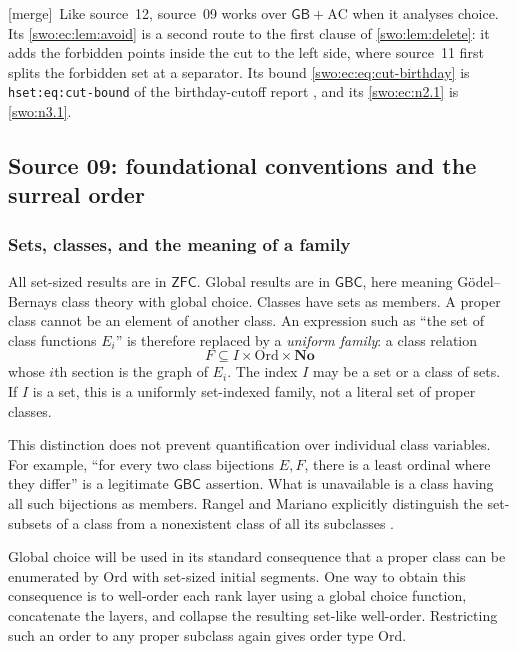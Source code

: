 \documentclass[11pt]{article}
\theoremstyle{definition}
\theoremstyle{remark}
\newcommand{\No}{\mathbf{No}}
\newcommand{\Ord}{\mathrm{Ord}}
\newcommand{\GB}{\mathsf{GB}}
\newcommand{\GBC}{\mathsf{GBC}}
\newcommand{\ZFC}{\mathsf{ZFC}}
\newcommand{\code}[1]{\texttt{\small #1}}
\newcommand{\merge}{\textsf{[merge]}}
\begin{document}

\merge\ Like source~12, source~09 works over $\GB+\mathrm{AC}$ when it
analyses choice. Its \cref{swo:ec:lem:avoid} is a second route to the first
clause of \cref{swo:lem:delete}: it adds the forbidden points inside the cut
to the left side, where source~11 first splits the forbidden set at a
separator. Its bound \eqref{swo:ec:eq:cut-birthday} is
\code{hset:eq:cut-bound} of the birthday-cutoff report \cite{ProveItHset},
and its \cref{swo:ec:n2.1} is \cref{swo:n3.1}.

\subsection{Source 09: foundational conventions and the surreal order}
\label{swo:ec:sec:foundations}
\subsubsection{Sets, classes, and the meaning of a family}
All set-sized results are in $\ZFC$. Global results are in $\GBC$, here
meaning G\"odel--Bernays class theory with global choice. Classes have sets
as members. A proper class cannot be an element of another class. An
expression such as ``the set of class functions $E_i$'' is therefore
replaced by a \emph{uniform family}: a class relation
\[
       F\subseteq I\times\Ord\times\No
\]
whose $i$th section is the graph of $E_i$. The index $I$ may be a set or a
class of sets. If $I$ is a set, this is a uniformly set-indexed family,
not a literal set of proper classes.

This distinction does not prevent quantification over individual class
variables. For example, ``for every two class bijections $E,F$, there is
a least ordinal where they differ'' is a legitimate $\GBC$ assertion.
What is unavailable is a class having all such bijections as members.
Rangel and Mariano explicitly distinguish the set-subsets of a class
from a nonexistent class of all its subclasses \cite[\S1.1.1]{RochaRangelMariano}.

Global choice will be used in its standard consequence that a proper
class can be enumerated by $\Ord$ with set-sized initial segments. One
way to obtain this consequence is to well-order each rank layer using a
global choice function, concatenate the layers, and collapse the resulting
set-like well-order. Restricting such an order to any proper subclass
again gives order type $\Ord$.
\end{document}
